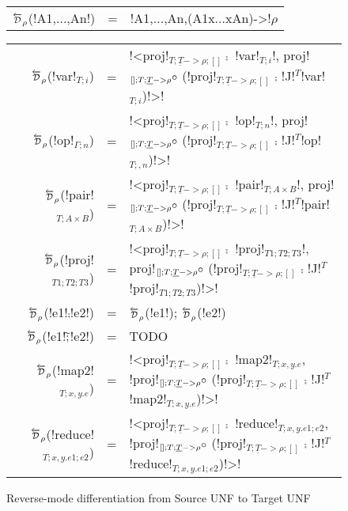 \begin{figure*}[t]
    \begin{tabular}{r c l}
        $\Dsynrevsymbol_{\rho}$(!A1,$\ldots$,An!) &=& !A1,$\ldots$,An,(A1x$\ldots$xAn)->!$\rho$
    \end{tabular}

    \medskip
    \begin{tabular}{r c l}
    $\Dsynrevsymbol_{\rho}$(!var!$_{T;i}$) &=& !<proj!$_{T;\underline{T}->\rho;[]} \comp$ !var!$_{T;i}$!, proj!$_{[];T;\underline{T}->\rho} \circ$ (!proj!$_{T;\underline{T}->\rho;[]}$ $\comp$ !J!$^T$!var!$_{T;i}$)!>! \\
    $\Dsynrevsymbol_{\rho}$(!op!$_{\Gamma;n}$) &=& !<proj!$_{T;\underline{T}->\rho;[]} \comp$ !op!$_{T;n}$!, proj!$_{[];T;\underline{T}->\rho} \circ$ (!proj!$_{T;\underline{T}->\rho;[]}$ $\comp$ !J!$^T$!op!$_{T;,n}$)!>! \\ 
    $\Dsynrevsymbol_{\rho}$(!pair!$_{T;A\times B}$) &=& !<proj!$_{T;\underline{T}->\rho;[]} \comp$ !pair!$_{T;A\times B}$!, proj!$_{[];T;\underline{T}->\rho} \circ$ (!proj!$_{T;\underline{T}->\rho;[]}$ $\comp$ !J!$^T$!pair!$_{T;A\times B}$)!>! \\
    $\Dsynrevsymbol_{\rho}$(!proj!$_{T1;T2;T3}$) &=& !<proj!$_{T;\underline{T}->\rho;[]} \comp$ !proj!$_{T1;T2;T3}$!, proj!$_{[];T;\underline{T}->\rho} \circ$ (!proj!$_{T;\underline{T}->\rho;[]}$ $\comp$ !J!$^T$!proj!$_{T1;T2;T3}$)!>! \\
    $\Dsynrevsymbol_{\rho}$(!e1!$\comp$!e2!) &=& $\Dsynrevsymbol_{\rho}$(!e1!); $\Dsynrevsymbol_{\rho}$(!e2!)\\ 
    $\Dsynrevsymbol_{\rho}$(!e1!$\widetilde{;}$!e2!) &=& TODO \\
    $\Dsynrevsymbol_{\rho}$(!map2!$_{T;x,y.e}$) &=& !<proj!$_{T;\underline{T}->\rho;[]} \comp$ !map2!$_{T;x,y.e}$, !proj!$_{[];T;\underline{T}->\rho} \circ$ (!proj!$_{T;\underline{T}->\rho;[]}$ $\comp$ !J!$^T$!map2!$_{T;x,y.e}$)!>! \\
    $\Dsynrevsymbol_{\rho}$(!reduce!$_{T;x,y.e1;e2}$) &=& !<proj!$_{T;\underline{T}->\rho;[]} \comp$ !reduce!$_{T;x,y.e1;e2}$, !proj!$_{[];T;\underline{T}->\rho} \circ$ (!proj!$_{T;\underline{T}->\rho;[]}$ $\comp$ !J!$^T$!reduce!$_{T;x,y.e1;e2}$)!>! \\
    \end{tabular}
    \caption{Reverse-mode differentiation from Source UNF to Target UNF}
    \label{fig:diff_macro}    
\end{figure*}